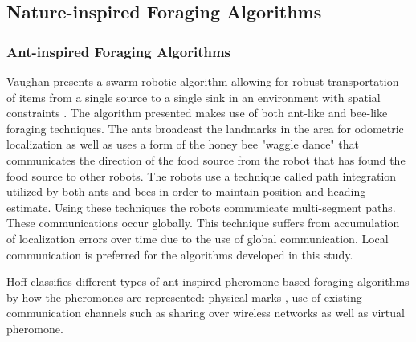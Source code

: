 \subsection{Nature-inspired Foraging Algorithms}
\label{sec:second:natureinspired}


\subsubsection{Ant-inspired Foraging Algorithms}

Vaughan presents a swarm robotic algorithm allowing for robust transportation of items from a single source to a single sink in an environment with spatial constraints \cite{vaughan2000blazing}. The algorithm presented makes use of both ant-like and bee-like foraging techniques. The ants broadcast the landmarks in the area for odometric localization as well as uses a form of the  honey bee "waggle dance" that communicates the direction of the food source from the robot that has found the food source to other robots. The robots use a technique called path integration utilized by both ants and bees in order to maintain position and heading estimate. Using these techniques the robots communicate multi-segment paths. These communications occur globally. This technique suffers from accumulation of localization errors over time due to the use of global communication. Local communication is preferred for the algorithms developed in this study.   %


Hoff \cite{hoff2010two} classifies different types of ant-inspired pheromone-based foraging algorithms by how the pheromones are represented: physical marks \cite{alcoholfromants2012}, use of existing communication channels such as sharing over wireless networks as well as virtual pheromone. %

